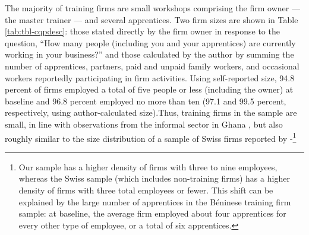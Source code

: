\documentclass[
  a4paper, twoside, 12pt]{book}
\begin{document}
The majority of training firms are small workshops comprising the firm owner --- the master trainer --- and several apprentices. Two firm sizes are shown in Table \ref{tab:tbl-cqpdesc}: those stated directly by the firm owner in response to the question, ``How many people (including you and your apprentices) are currently working in your business?'' and those calculated by the author by summing the number of apprentices, partners, paid and unpaid family workers, and occasional workers reportedly participating in firm activities. Using self-reported size, 94.8 percent of firms employed a total of five people or less (including the owner) at baseline and 96.8 percent employed no more than ten (97.1 and 99.5 percent, respectively, using author-calculated size).Thus, training firms in the sample are small, in line with observations from the informal sector in Ghana \autocite{frazer2006,velenchik1995}, but also roughly similar to the size distribution of a sample of Swiss firms reported by \textcite{muhlemann2007}-\footnote{Our sample has a higher density of firms with three to nine employees, whereas the Swiss sample (which includes non-training firms) has a higher density of firms with three total employees or fewer. This shift can be explained by the large number of apprentices in the Béninese training firm sample: at baseline, the average firm employed about four apprentices for every other type of employee, or a total of six apprentices.}
\end{document}
